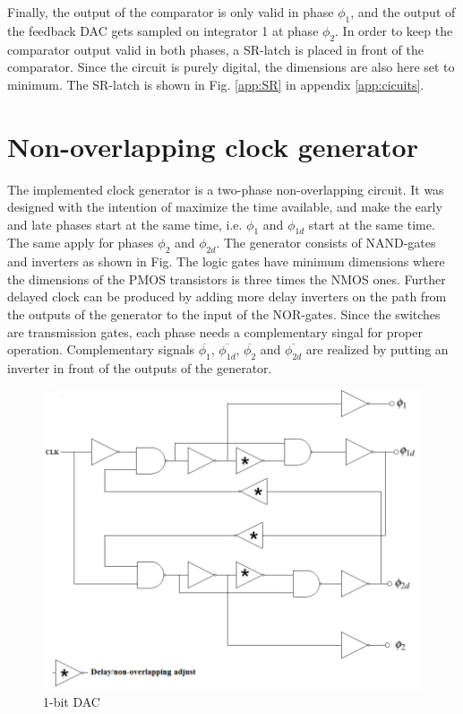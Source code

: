 Finally, the output of the comparator is only valid in phase $\phi_1$, and the output of the feedback DAC gets sampled on integrator 1 at phase $\phi_2$. In order to keep the comparator output valid in both phases, a SR-latch is placed in front of the comparator. Since the circuit is purely digital, the dimensions are also here set to minimum. The SR-latch is shown in Fig. \ref{app:SR} in appendix \ref{app:cicuits}.

\section{Non-overlapping clock generator}
The implemented clock generator is a two-phase non-overlapping circuit. It was designed with the intention of maximize the time available, and make the early and late phases start at the same time, i.e. $\phi_1$ and $\phi_{1d}$ start at the same time. The same apply for phases $\phi_2$ and $\phi_{2d}$. The generator consists of NAND-gates and inverters as shown in Fig. The logic gates have minimum dimensions where the dimensions of the PMOS transistors is three times the NMOS ones. Further delayed clock can be produced by adding more delay inverters on the path from the outputs of the generator to the input of the NOR-gates. Since the switches are transmission gates, each phase needs a complementary singal for proper operation. Complementary signals $\overline{\phi_1}$, $\overline{\phi_{1d}}$, $\overline{\phi_2}$ and $\overline{\phi_{2d}}$ are realized by putting an inverter in front of the outputs of the generator. 

\begin{figure}[h]
\centering
\includegraphics[scale = 0.5]{images/two_phase_clock.png}
\caption{1-bit DAC}
\label{clock_block}
\end{figure}


